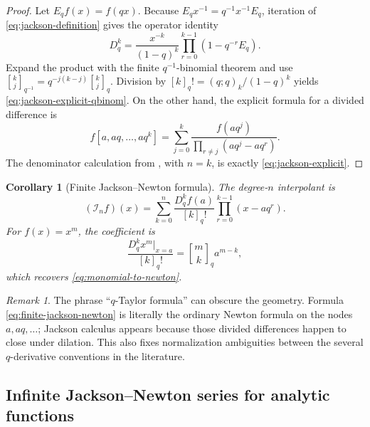 \documentclass[11pt,a4paper,oneside]{article}
\newtheorem{corollary}[corollary]{Corollary}
\theoremstyle{definition}
\theoremstyle{remark}
\newtheorem{remark}[remark]{Remark}
\newcommand{\Iop}{\mathcal I}
\newcommand{\qbinom}[3]{\genfrac{[}{]}{0pt}{}{#1}{#2}_{#3}}
\begin{document}
\begin{proof}
Let $E_qf(x)=f(qx)$.  Because $E_qx^{-1}=q^{-1}x^{-1}E_q$,
iteration of \eqref{eq:jackson-definition} gives the operator identity
\begin{equation}
 D_q^k
 =\frac{x^{-k}}{(1-q)^k}
 \prod_{r=0}^{k-1}(1-q^{-r}E_q).
 \label{eq:jackson-operator-product}
\end{equation}
Expand the product with the finite $q^{-1}$-binomial theorem and use
\(
 \qbinom kj{q^{-1}}=q^{-j(k-j)}\qbinom kjq
\).  Division by
$[k]_q!=(q;q)_k/(1-q)^k$ yields
\eqref{eq:jackson-explicit-qbinom}.  On the other hand, the explicit formula
for a divided difference is
\[
 f[a,aq,\ldots,aq^k]
 =\sum_{j=0}^k
 \frac{f(aq^j)}{\prod_{r\ne j}(aq^j-aq^r)}.
\]
The denominator calculation from , with $n=k$, is
exactly \eqref{eq:jackson-explicit}.
\end{proof}

\begin{corollary}[Finite Jackson--Newton formula]
\label{cor:finite-jackson-newton}
The degree-$n$ interpolant is
\begin{equation}
 (\Iop_nf)(x)
 =\sum_{k=0}^n\frac{D_q^kf(a)}{[k]_q!}
   \prod_{r=0}^{k-1}(x-aq^r).
 \label{eq:finite-jackson-newton}
\end{equation}
For $f(x)=x^m$, the coefficient is
\begin{equation}
 \frac{D_q^kx^m|_{x=a}}{[k]_q!}
 =\qbinom mkq a^{m-k},
 \label{eq:monomial-jackson}
\end{equation}
which recovers \eqref{eq:monomial-to-newton}.
\end{corollary}

\begin{remark}
The phrase ``$q$-Taylor formula'' can obscure the geometry.  Formula
\eqref{eq:finite-jackson-newton} is literally the ordinary Newton formula on
the nodes $a,aq,\ldots$; Jackson calculus appears because those divided
differences happen to close under dilation.  This also fixes normalization
ambiguities between the several $q$-derivative conventions in the literature.
\end{remark}

\subsection{Infinite Jackson--Newton series for analytic functions}
\end{document}
